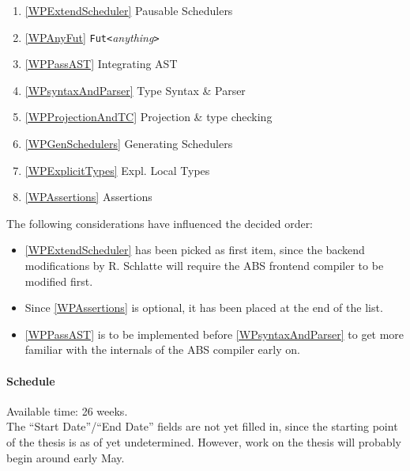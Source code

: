 \documentclass[paper=a4,nochapname,accentcolor=tud9c]{tudexercise}
\newcommand{\setdate}[1]{%
    \DTMsavedate{mydate}{#1}%
    \DTMmakeglobal{mydate}%
}%
\newcommand{\adddays}[1]{%
    \DTMsaveddateoffsettojulianday{mydate}{#1}{\mydatect}%
    \DTMsavejulianday{mydate}{\number\mydatect}%
    \DTMmakeglobal{mydate}%
}%
\begin{document}
\begin{enumerate}[label=(\arabic*)]
  \item \label{orderExtendScheduler} \ref{WPExtendScheduler} Pausable Schedulers
  \item \label{orderAnyFut} \ref{WPAnyFut} \texttt{Fut<}\emph{anything}\texttt{>}
  \item \label{orderPassAST} \ref{WPPassAST} Integrating AST
  \item \label{ordersyntaxAndParser} \ref{WPsyntaxAndParser} Type Syntax \& Parser
  \item \label{orderProjectionAndTC} \ref{WPProjectionAndTC} Projection \& type checking
  \item \label{orderGenSchedulers} \ref{WPGenSchedulers} Generating Schedulers
  \item \label{orderExplicitTypes} \ref{WPExplicitTypes} Expl. Local Types
  \item \label{orderAssertions} \ref{WPAssertions} Assertions
\end{enumerate}

The following considerations have influenced the decided order:
\begin{itemize}
  \item \ref{WPExtendScheduler} has been picked as first item, since the
    backend modifications by R. Schlatte will require the ABS frontend compiler
    to be modified first.
  \item Since \ref{WPAssertions} is optional, it has been placed at the end of
    the list.
  \item \ref{WPPassAST} is to be implemented before \ref{WPsyntaxAndParser} to
    get more familiar with the internals of the ABS compiler early on.
\end{itemize}

\paragraph{Schedule}%
%
Available time: 26 weeks.
\\
The ``Start Date''/``End Date'' fields are not yet filled in, since the
starting point of the thesis is as of yet undetermined.
However, work on the thesis will probably begin around early May.

\medskip
%
\setdate{2019-05-08}%
\newcommand\nextdays[1]{\adddays{#1}\DTMusedate{mydate}}%
\newcommand\nextday{\nextdays{1}}%
%
\end{document}
